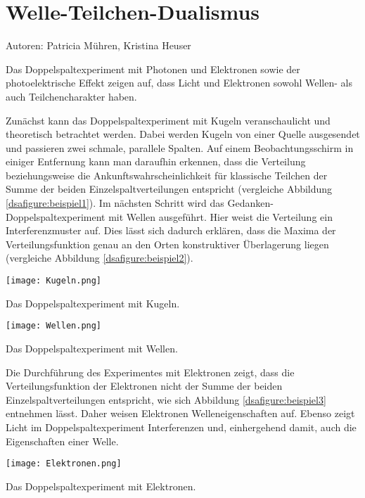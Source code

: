 \section{Welle-Teilchen-Dualismus}

Autoren: Patricia Mühren, Kristina Heuser

Das Doppelspaltexperiment mit Photonen und Elektronen sowie der photoelektrische Effekt zeigen auf, dass Licht und Elektronen sowohl Wellen- als auch Teilchencharakter haben.

Zunächst kann das Doppelspaltexperiment mit Kugeln veranschaulicht und theoretisch betrachtet werden. Dabei werden Kugeln von einer Quelle ausgesendet und passieren zwei schmale, parallele Spalten. Auf einem Beobachtungsschirm in einiger Entfernung kann man daraufhin erkennen, dass die Verteilung beziehungsweise die Ankunftswahrscheinlichkeit für klassische Teilchen der Summe der beiden Einzelspaltverteilungen entspricht (vergleiche Abbildung \ref{dsafigure:beispiel1}). Im nächsten Schritt wird das Gedanken-Doppelspaltexperiment mit Wellen ausgeführt. Hier weist die Verteilung ein Interferenzmuster auf. Dies lässt sich dadurch erklären, dass die Maxima der Verteilungsfunktion genau an den Orten konstruktiver Überlagerung liegen (vergleiche Abbildung \ref{dsafigure:beispiel2}). 

\begin{dsafigure}
\centering
\texttt{[image: Kugeln.png]}
\caption{Das Doppelspaltexperiment mit Kugeln. \cite{Doppelspalt}}
\label{dsafigure:beispiel1}
\end{dsafigure}

\begin{dsafigure}
\centering
\texttt{[image: Wellen.png]}
\caption{Das Doppelspaltexperiment mit Wellen. \cite{Doppelspalt}}
\label{dsafigure:beispiel2}
\end{dsafigure}

Die Durchführung des Experimentes mit Elektronen zeigt, dass die Verteilungsfunktion der Elektronen nicht der Summe der beiden Einzelspaltverteilungen entspricht, wie sich Abbildung \ref{dsafigure:beispiel3} entnehmen lässt. Daher weisen Elektronen Welleneigenschaften auf. Ebenso zeigt Licht im Doppelspaltexperiment Interferenzen und, einhergehend damit, auch die Eigenschaften einer Welle. 

\begin{dsafigure}
\centering
\texttt{[image: Elektronen.png]}
\caption{Das Doppelspaltexperiment mit Elektronen. \cite{Doppelspalt}}
\label{dsafigure:beispiel3}
\end{dsafigure}

